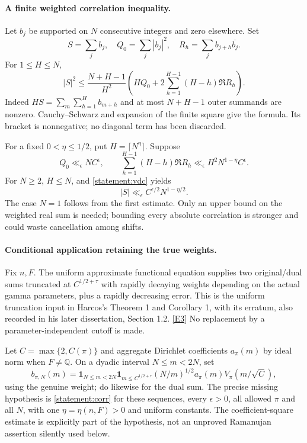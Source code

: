 \documentclass[11pt,a4paper]{article}
\newcommand{\Q}{\mathbb{Q}}
\newcommand{\eref}[2]{\hyperlink{extra:#1:#2}{[E#2]}}
\numberwithin{equation}{section}
\begin{document}
\paragraph{A finite weighted correlation inequality.}
Let $b_j$ be supported on $N$ consecutive integers and zero elsewhere. Set
\[
 S=\sum_jb_j,\quad Q_0=\sum_j|b_j|^2,\quad
 R_h=\sum_jb_{j+h}\overline{b_j}.
\]
For $1\le H\le N$,
\begin{equation}\label{statement:vdc}
 |S|^2\le\frac{N+H-1}{H^2}
 \left(HQ_0+2\sum_{h=1}^{H-1}(H-h)\Re R_h\right).
\end{equation}
Indeed $HS=\sum_m\sum_{h=1}^H b_{m+h}$ and at most $N+H-1$ outer summands
are nonzero. Cauchy--Schwarz and expansion of the finite square give the
formula. Its bracket is nonnegative; no diagonal term has been discarded.

For a fixed $0<\eta\le1/2$, put $H=\lceil N^\eta\rceil$. Suppose
\begin{equation}\label{statement:corr}
 Q_0\ll_\epsilon NC^\epsilon,\qquad
 \sum_{h=1}^{H-1}(H-h)\Re R_h
       \ll_\epsilon H^2N^{1-\eta}C^\epsilon.
\end{equation}
For $N\ge2$, $H\le N$, and \eqref{statement:vdc} yields
\[
 |S|\ll_\epsilon C^{\epsilon/2}N^{1-\eta/2}.
\]
The case $N=1$ follows from the first estimate. Only an upper bound on the
weighted real sum is needed; bounding every absolute correlation is
stronger and could waste cancellation among shifts.

\paragraph{Conditional application retaining the true weights.}
Fix $n,F$. The uniform approximate functional equation supplies two
original/dual sums truncated at $C^{1/2+\tau}$ with rapidly decaying weights
depending on the actual gamma parameters, plus a rapidly decreasing error.
This is the uniform truncation input in Harcos's Theorem 1 and Corollary 1,
with its erratum, also recorded in his later dissertation, Section 1.2.
\eref{statement}{3} No replacement by a parameter-independent cutoff is made.

Let $C=\max\{2,C(\pi)\}$ and aggregate Dirichlet coefficients $a_\pi(m)$
by ideal norm when $F\ne\Q$. On a dyadic interval $N\le m<2N$, set
\[
 b_{\pi,N}(m)=\mathbf1_{N\le m<2N}\mathbf1_{m\le C^{1/2+\tau}}
       (N/m)^{1/2}a_\pi(m)V_\pi(m/\sqrt C),
\]
using the genuine weight; do likewise for the dual sum. The precise missing
hypothesis is \eqref{statement:corr} for these sequences, every $\epsilon>0$,
all allowed $\pi$ and all $N$, with one $\eta=\eta(n,F)>0$ and uniform
constants. The coefficient-square estimate is explicitly part of the
hypothesis, not an unproved Ramanujan assertion silently used below.
\end{document}
